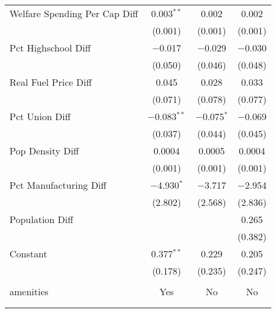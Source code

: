 \begin{table}[!htbp]
\begin{tabular}{@{\extracolsep{5pt}}lccc}
  Welfare Spending Per Cap Diff & 0.003$^{**}$ & 0.002 & 0.002 \\ 
  & (0.001) & (0.001) & (0.001) \\ 
  Pct Highschool Diff & $-$0.017 & $-$0.029 & $-$0.030 \\ 
  & (0.050) & (0.046) & (0.048) \\ 
  Real Fuel Price Diff & 0.045 & 0.028 & 0.033 \\ 
  & (0.071) & (0.078) & (0.077) \\ 
  Pct Union Diff & $-$0.083$^{**}$ & $-$0.075$^{*}$ & $-$0.069 \\ 
  & (0.037) & (0.044) & (0.045) \\ 
  Pop Density Diff & 0.0004 & 0.0005 & 0.0004 \\ 
  & (0.001) & (0.001) & (0.001) \\ 
  Pct Manufacturing Diff & $-$4.930$^{*}$ & $-$3.717 & $-$2.954 \\ 
  & (2.802) & (2.568) & (2.836) \\ 
  Population Diff &  &  & 0.265 \\ 
  &  &  & (0.382) \\ 
  Constant & 0.377$^{**}$ & 0.229 & 0.205 \\ 
  & (0.178) & (0.235) & (0.247) \\ 
 \hline \\[-1.8ex] 
amenities & Yes & No & No \\ 
\hline \\[-1.8ex] 
\hline 
\hline \\[-1.8ex] 
\end{tabular} 
\end{table} 
